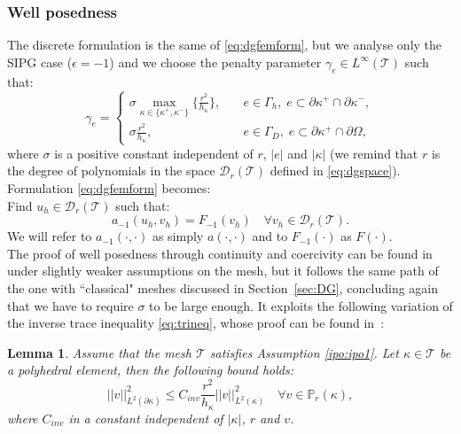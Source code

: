 \documentclass[12pt, a4paper]{article}
\theoremstyle{definition}
\theoremstyle{plain}
\newtheorem{lemma}{Lemma}
\theoremstyle{plain}
\theoremstyle{definition}
\begin{document}
\subsubsection{Well posedness}
The discrete formulation is the same of \eqref{eq:dgfemform}, but we analyse 
only the SIPG case ($\epsilon=-1$) and we choose the penalty parameter 
$\gamma_e \in L^\infty(\mathcal{T})$ such that:
\begin{equation} \label{eq:penalty}
	\gamma_e =
	\begin{cases}
		\sigma \max\limits_{\kappa \in \{\kappa^+, \kappa^-\}} \big\{ \frac{r^2}{h_\kappa}\big\},
		& \quad e \in \Gamma_h, \; e \subset \partial\kappa^+ \cap \partial\kappa^-,\\
		\sigma\frac{r^2}{h_\kappa},& \quad e \in \Gamma_D, \; e \subset \partial\kappa^+ \cap \partial\Omega,
	\end{cases}
\end{equation}
where $\sigma$ is a positive constant independent of $r$, $|e|$ and $|\kappa|$ 
(we remind that $r$ is the degree of polynomials in the space 
$\mathcal{D}_r(\mathcal{T})$ defined in \eqref{eq:dgspace}).\\
Formulation \eqref{eq:dgfemform} becomes:\\
Find $u_h \in \mathcal{D}_r(\mathcal{T})$ such that:
\begin{equation} \label{eq:dgfempolyform}
	a_{-1}(u_h, v_h) = F_{-1}(v_h) \quad \forall v_h \in 
	\mathcal{D}_r(\mathcal{T}).
\end{equation}
We will refer to $a_{-1}(\cdot, \cdot)$ as simply $a(\cdot, \cdot)$ and to 
$F_{-1}(\cdot)$ as $F(\cdot)$.\\
The proof of well posedness through continuity and coercivity can be found in 
\cite{hpmet} under slightly weaker assumptions on the mesh, but it follows the 
same path of the one with ``classical" meshes discussed in 
Section~\ref{sec:DG}, concluding again that we have to require $\sigma$ to be 
large enough. It exploits the following variation of the inverse trace 
inequality \eqref{eq:trineq}, whose proof can be found in~\cite{multigrid}:
\begin{lemma}
	Assume that the mesh $\mathcal{T}$ satisfies Assumption \ref{ipo:ipo1}. Let $\kappa \in \mathcal{T}$ be a polyhedral element, then the following bound holds:
	\begin{equation*}
		|\!|v|\!|^2_{L^2(\partial\kappa)} \leq C_{inv} \frac{r^2}{h_\kappa} 
		|\!|v|\!|^2_{L^2(\kappa)} \quad \forall v \in \mathbb{P}_r(\kappa),
	\end{equation*}
	where $C_{inv}$ in a constant independent of $|\kappa|$, $r$ and $v$.
\end{lemma}
\end{document}
